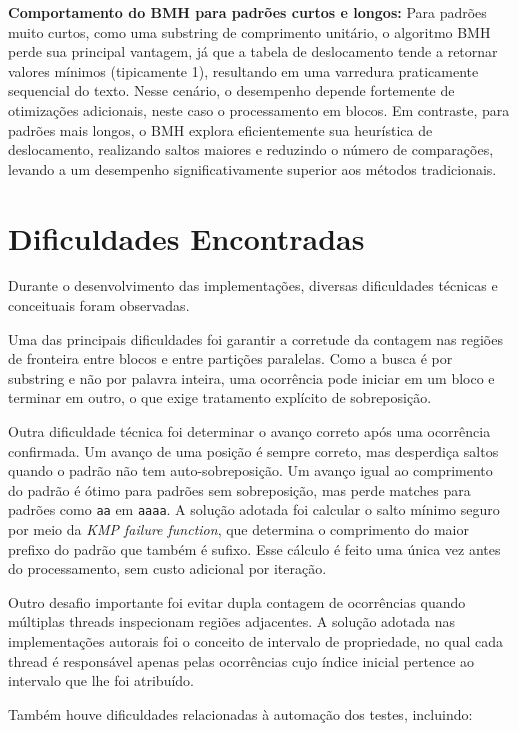 \documentclass[10pt,twocolumn,a4paper]{article}
\begin{document}
\textbf{Comportamento do BMH para padrões curtos e longos:}
Para padrões muito curtos, como uma substring de comprimento unitário, o algoritmo BMH perde sua principal vantagem, já que a tabela de deslocamento tende a retornar valores mínimos (tipicamente 1), resultando em uma varredura praticamente sequencial do texto. Nesse cenário, o desempenho depende fortemente de otimizações adicionais, neste caso o processamento em blocos. Em contraste, para padrões mais longos, o BMH explora eficientemente sua heurística de deslocamento, realizando saltos maiores e reduzindo o número de comparações, levando a um desempenho significativamente superior aos métodos tradicionais.


\section{Dificuldades Encontradas}

Durante o desenvolvimento das implementações, diversas dificuldades técnicas e conceituais foram observadas.

Uma das principais dificuldades foi garantir a corretude da contagem nas regiões de fronteira entre blocos e entre partições paralelas. Como a busca é por substring e não por palavra inteira, uma ocorrência pode iniciar em um bloco e terminar em outro, o que exige tratamento explícito de sobreposição.

Outra dificuldade técnica foi determinar o avanço correto após uma ocorrência confirmada. Um avanço de uma posição é sempre correto, mas desperdiça saltos quando o padrão não tem auto-sobreposição. Um avanço igual ao comprimento do padrão é ótimo para padrões sem sobreposição,
mas perde matches para padrões como \texttt{aa} em \texttt{aaaa}. A solução adotada foi calcular o salto mínimo seguro por meio da \textit{KMP failure function}, que determina o comprimento do maior prefixo do padrão que também é sufixo. Esse cálculo é feito uma única
vez antes do processamento, sem custo adicional por iteração.

Outro desafio importante foi evitar dupla contagem de ocorrências quando múltiplas threads inspecionam regiões adjacentes. A solução adotada nas implementações autorais foi o conceito de intervalo de propriedade, no qual cada thread é responsável apenas pelas ocorrências cujo índice inicial pertence ao intervalo que lhe foi atribuído.

Também houve dificuldades relacionadas à automação dos testes, incluindo:
\end{document}
